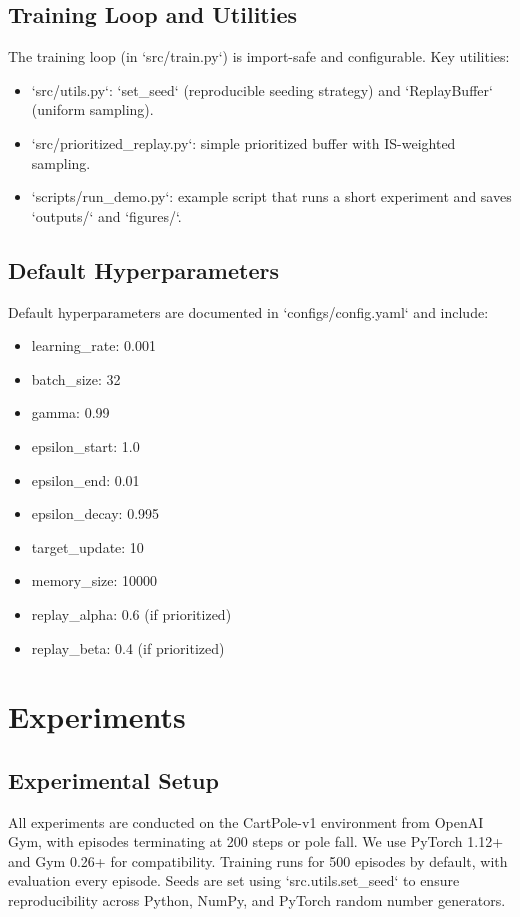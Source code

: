 \documentclass{IEEEtran}
\begin{document}
\subsection{Training Loop and Utilities}

The training loop (in `src/train.py`) is import-safe and configurable. Key utilities:
\begin{itemize}
\item `src/utils.py`: `set_seed` (reproducible seeding strategy) and `ReplayBuffer` (uniform sampling).
\item `src/prioritized_replay.py`: simple prioritized buffer with IS-weighted sampling.
\item `scripts/run_demo.py`: example script that runs a short experiment and saves `outputs/` and `figures/`.
\end{itemize}

\subsection{Default Hyperparameters}

Default hyperparameters are documented in `configs/config.yaml` and include:
\begin{itemize}
\item learning\_rate: 0.001
\item batch\_size: 32
\item gamma: 0.99
\item epsilon\_start: 1.0
\item epsilon\_end: 0.01
\item epsilon\_decay: 0.995
\item target\_update: 10
\item memory\_size: 10000
\item replay\_alpha: 0.6 (if prioritized)
\item replay\_beta: 0.4 (if prioritized)
\end{itemize}

\section{Experiments}

\subsection{Experimental Setup}

All experiments are conducted on the CartPole-v1 environment from OpenAI Gym, with episodes terminating at 200 steps or pole fall. We use PyTorch 1.12+ and Gym 0.26+ for compatibility. Training runs for 500 episodes by default, with evaluation every episode. Seeds are set using `src.utils.set_seed` to ensure reproducibility across Python, NumPy, and PyTorch random number generators.
\end{document}
